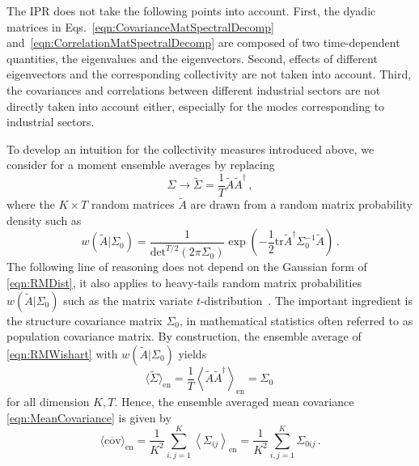 \documentclass[aps, pra, groupedaddress, showkeys, twocolumn, floatfix, 10pt]{revtex4-2}
\newcommand*\mean[1]{\overline{#1}}
\begin{document}
The IPR does not take the following points into account.
First, the dyadic matrices in Eqs.~\eqref{eqn:CovarianceMatSpectralDecomp} and~\eqref{eqn:CorrelationMatSpectralDecomp} are composed of two time-dependent quantities, the eigenvalues and the eigenvectors.
Second, effects of different eigenvectors and the corresponding collectivity are not taken into account.
Third, the covariances and correlations between different industrial sectors are not directly taken into account either, especially for the modes corresponding to industrial sectors.

To develop an intuition for the collectivity measures introduced above, we consider for a moment ensemble averages by replacing
%
\begin{equation} \label{eqn:RMWishart}
	\Sigma \longrightarrow \widetilde{\Sigma} = \frac{1}{T} \widetilde{A} {\widetilde{A}}^{\dagger} \,,
\end{equation}
% 
where the $K \times T$ random matrices $\widetilde{A}$ are drawn from a random matrix probability density such as
%
\begin{equation} \label{eqn:RMDist}
	w(\widetilde{A}|\Sigma_0) = \frac{1}{\text{det}^{T/2} \left( 2 \pi \Sigma_0 \right) } \exp\left( - \frac{1}{2} \text{tr} \widetilde{A}^{\dagger} \Sigma_0^{-1} \widetilde{A} \right)\,.
\end{equation}
%
The following line of reasoning does not depend on the Gaussian form of \eqref{eqn:RMDist}, it also applies to heavy-tails random matrix probabilities $w(\widetilde{A}| \Sigma_0)$ such as the matrix variate $t$-distribution~\cite{gupta2018matrix}. The important ingredient is the structure covariance matrix $\Sigma_0$, in mathematical statistics often referred to as population covariance matrix.
By construction, the ensemble average of \eqref{eqn:RMWishart} with $w(\widetilde{A}|\Sigma_0)$ yields
%
\begin{equation} \label{eqn:RMWishartMean}
	 \langle \widetilde{\Sigma} \rangle_{\text{en}} = \frac{1}{T} \left\langle \widetilde{A} \widetilde{A}^{\dagger} \right\rangle_{\text{en}}  = \Sigma_0   \, 
\end{equation}
% 
for all dimension $K,T$. Hence, the ensemble averaged mean covariance \eqref{eqn:MeanCovariance} is given by
%
\begin{equation} \label{eqn:RMMeanCovariance}
	  \langle  \mean{\text{cov}}  \rangle_{\text{en}}  = \frac{1}{K^2} \sum_{i,j = 1}^K \left\langle \Sigma_{ij} \right\rangle_{\text{en}} = \frac{1}{K^2} \sum_{i,j = 1}^K \Sigma_{0ij} \,.
\end{equation}
\end{document}

